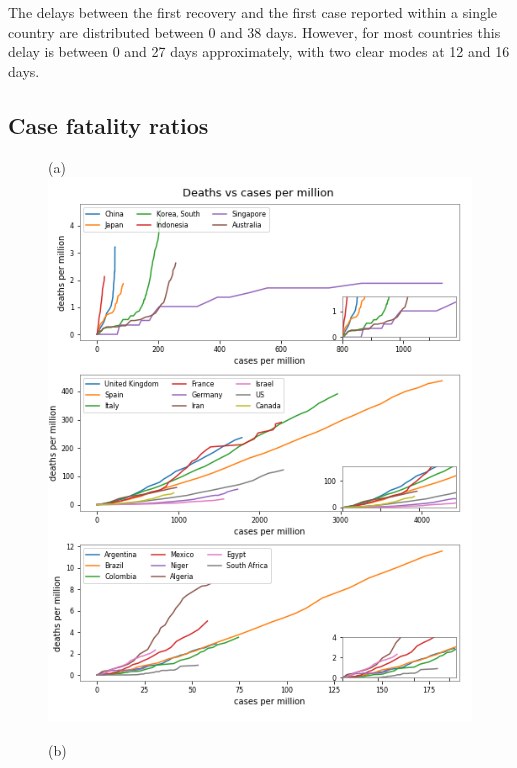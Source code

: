 \documentclass[8pt]{article}
\begin{document}
The delays between the first recovery and the first case reported within a single country are distributed between 0 and 38 days. However, for most countries this delay is between 0 and 27 days approximately, with two clear modes at 12 and 16 days.  

\subsection{Case fatality ratios}

\begin{figure}[h]
    \centering
    \begin{minipage}{0.5\textwidth}
    (a)\\
    \includegraphics[width=\textwidth]{figures/tsam_Covid19_JHU_cases-deaths_x1000000_JHU.png}
    \end{minipage}%
    \begin{minipage}{0.5\textwidth}
    (b)\\

\end{minipage}
\end{figure}
\end{document}
